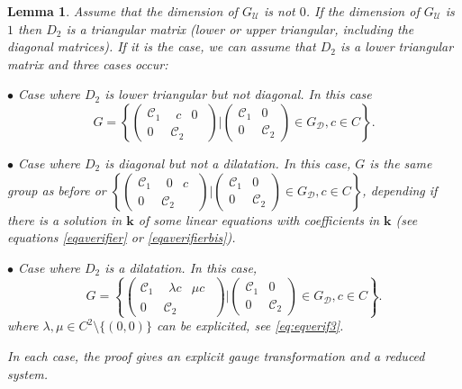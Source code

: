 \documentclass[a4paper,11pt]{amsart}
\newcommand{\Gdiag}{G_{\mathcal{D}}}
\newcommand{\Gunip}{G_{\mathcal{U}}}
\newtheorem{lem}[thm]{Lemma}
\def\k{\mathbf{k}}
\begin{document}
\begin{lem}
\label{lem:dimGu1}
Assume that the dimension of $\Gunip$ is not $0$. 
 If the dimension of $\Gunip$ is $1$ then $D_2$ is a triangular matrix (lower or upper triangular, including the diagonal matrices).
If it is the case, we can assume that $D_2$ is a lower triangular matrix and three cases occur:

$\bullet$ Case where $D_2$ is lower triangular but not diagonal. In this case 
$$G =  \left\{ \begin{pmatrix}
\mathscr{C}_1& \begin{matrix} c&0 \end{matrix} \\ 
0 & \mathscr{C}_2
\end{pmatrix}\Bigg|   \begin{pmatrix}
\mathscr{C}_1& 0 \\ 
0 & \mathscr{C}_2
\end{pmatrix} \in \Gdiag,   c\in C \right\}.
$$

$\bullet$ Case where $D_2$ is diagonal but not a dilatation.  In this case, $G$ is the same group as before or $\left\{ \begin{pmatrix}
\mathscr{C}_1& \begin{matrix} 0&c \end{matrix} \\ 
0 & \mathscr{C}_2
\end{pmatrix}\Bigg|   \begin{pmatrix}
\mathscr{C}_1& 0 \\ 
0 & \mathscr{C}_2
\end{pmatrix} \in \Gdiag,   c\in C \right\}$, depending if there is a solution in $\k$ of some linear equations with coefficients in $\k$ (see equations \eqref{eqaverifier} or \eqref{eqaverifierbis}). 

$\bullet$ Case where $D_2$ is a dilatation.  In this case,
$$G =  \left\{ \begin{pmatrix}
\mathscr{C}_1& \begin{matrix} \lambda c & \mu c \end{matrix} \\ 
0 & \mathscr{C}_2
\end{pmatrix}\Bigg|   \begin{pmatrix}
\mathscr{C}_1& 0 \\ 
0 & \mathscr{C}_2
\end{pmatrix} \in \Gdiag,   c\in C \right\}.
$$
where $\lambda, \mu\in C^2 \setminus \{(0,0)\}$ can be explicited, see \eqref{eq:eqverif3}.

In each case,  the proof gives an  explicit gauge transformation and a reduced system.
\end{lem}
\end{document}
